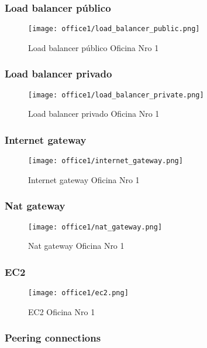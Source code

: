 \subsubsection{Load balancer público}
\begin{figure}[h]
    \centering
    \texttt{[image: office1/load\_balancer\_public.png]}
    \caption{Load balancer público Oficina Nro 1}
\end{figure}


\subsubsection{Load balancer privado}
\begin{figure}[h]
    \centering
    \texttt{[image: office1/load\_balancer\_private.png]}
    \caption{Load balancer privado Oficina Nro 1}
\end{figure}


\subsubsection{Internet gateway}
\begin{figure}[h]
    \centering
    \texttt{[image: office1/internet\_gateway.png]}
    \caption{Internet gateway Oficina Nro 1}
\end{figure}

\subsubsection{Nat gateway}
\begin{figure}[h]
    \centering
    \texttt{[image: office1/nat\_gateway.png]}
    \caption{Nat gateway Oficina Nro 1}
\end{figure}


\subsubsection{EC2}
\begin{figure}[h]
    \centering
    \texttt{[image: office1/ec2.png]}
    \caption{EC2 Oficina Nro 1}
\end{figure}

\subsubsection{Peering connections}
